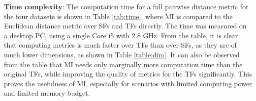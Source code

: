 \documentclass[10pt,twocolumn,letterpaper]{article}
\begin{document}
\textbf{Time complexity}: The computation time for a full pairwise distance metric for the
four datasets is shown in Table \ref{tab:time}, where MI is compared to the Euclidean distance
metric over SFs and TFs directly. The time was measured
on a desktop PC, using a single Core i5 with 2.8 GHz. From the table, it is clear
that computing metrics is much faster over TFs than over SFs, as they
are of much lower dimensions, as shown in Table \ref{table:dim}. It can
also be observed from the table that MI needs only marginally more
computation time than the original TFs, while improving the quality
of metrics for the TFs significantly. This proves the usefulness of
MI, especially for scenarios with limited computing power and limited
memory budget.




\end{document}
